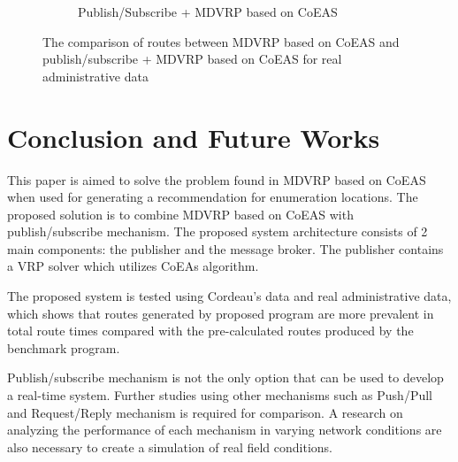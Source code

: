 \documentclass[conference]{IEEEtran}
\begin{document}
\begin{figure}[h!]
\begin{subfigure}[t]{0.5\textwidth}
		\caption{Publish/Subscribe + MDVRP based on CoEAS}
		\label{fig:test_result_normal_field_pubsub_coes_paper}
	\end{subfigure}
	\caption{The comparison of routes between MDVRP based on CoEAS and publish/subscribe + MDVRP based on CoEAS for real administrative data}
	\label{fig:test_result_normal_field_comparison}
\end{figure}


\section{Conclusion and Future Works}
\label{sec:conclusion-future-works}
This paper is aimed to solve the problem found in MDVRP based on CoEAS when used for generating a recommendation for enumeration locations. The proposed solution is to combine MDVRP based on CoEAS with publish/subscribe mechanism. The proposed system architecture consists of 2 main components: the publisher and the message broker. The publisher contains a VRP solver which utilizes CoEAs algorithm. 


The proposed system is tested using Cordeau's data and real administrative data, which shows that routes generated by proposed program are more prevalent in total route times compared with the pre-calculated routes produced by the benchmark program.


Publish/subscribe mechanism is not the only option that can be used to develop a real-time system. Further studies using other mechanisms such as Push/Pull and Request/Reply mechanism is required for comparison. A research on analyzing the performance of each mechanism in varying network conditions are also necessary to create a simulation of real field conditions.


%
%
\end{document}
